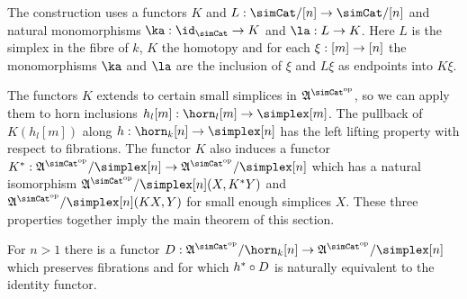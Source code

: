 \documentclass[csh.tex]{subfiles}
\begin{document}
The construction uses a functors $K$ and $L\of\simCat/[n]\to\simCat/[n]$ and natural monomorphisms $\ka\of \id_{\simCat}\to K$ and $\la \of L\to K$. Here $L$ is the simplex in the fibre of $k$, $K$ the homotopy and for each $\xi:[m]\to[n]$ the monomorphisms $\ka$ and $\la$ are the inclusion of $\xi$ and $L\xi$ as endpoints into $K\xi$.

The functors $K$ extends to certain small simplices in $\ambient\s$, so we can apply them to horn inclusions $h_l[m]\of\horn_l[m]\to\simplex[m]$. %
The pullback of $K(h_l[m])$ along $h\of\horn_k[n]\to\simplex[n]$ has the left lifting property with respect to fibrations. %
The functor $K$ also induces a functor $K\ri\of\ambient\s/\simplex[n]\to\ambient\s/\simplex[n]$ which has a natural isomorphism $\ambient\s/\simplex[n](X,K\ri Y)$ and $\ambient\s/\simplex[n](KX,Y)$ for small enough simplices $X$. %
These three properties together imply the main theorem of this section. %















\begin{theorem} For $n>1$ there is a functor $D\of \ambient\s/\horn_k[n]\to\ambient\s/\simplex[n]$ which preserves fibrations and for which $h^*\circ D$ is naturally equivalent to the identity functor. \end{theorem}
\end{document}
